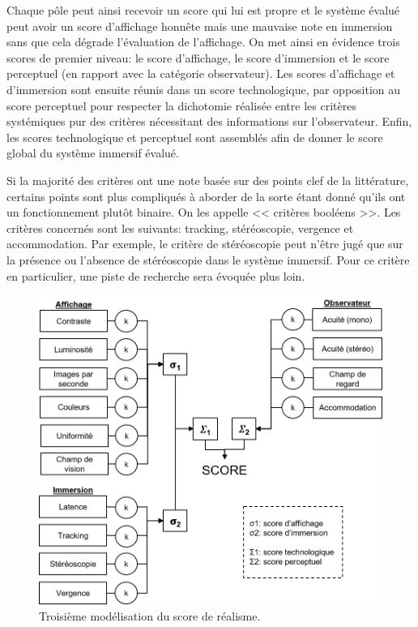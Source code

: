 	\par Chaque pôle peut ainsi recevoir un score qui lui est propre et le système évalué peut avoir un score d'affichage honnête mais une mauvaise note en immersion sans que cela dégrade l'évaluation de l'affichage. On met ainsi en évidence trois scores de premier niveau: le score d'affichage, le score d'immersion et le score perceptuel (en rapport avec la catégorie observateur). Les scores d'affichage et d'immersion sont ensuite réunis dans un score technologique, par opposition au score perceptuel pour respecter la dichotomie réalisée entre les critères systémiques pur des critères nécessitant des informations sur l'observateur. Enfin, les scores technologique et perceptuel sont assemblés afin de donner le score global du système immersif évalué.
	
	\par Si la majorité des critères ont une note basée sur des points clef de la littérature, certains points sont plus compliqués à aborder de la sorte étant donné qu'ils ont un fonctionnement plutôt binaire. On les appelle << critères booléens >>. Les critères concernés sont les suivants: tracking, stéréoscopie, vergence et accommodation. Par exemple, le critère de stéréoscopie peut n'être jugé que sur la présence ou l'absence de stéréoscopie dans le système immersif. Pour ce critère en particulier, une piste de recherche sera évoquée plus loin.
	
	\begin{figure}
		\centering
		\includegraphics[scale=1]{Figures/Modele3_2}
		\caption{Troisième modélisation du score de réalisme.}
		\label{fig:modèle_3}
	\end{figure}
	
